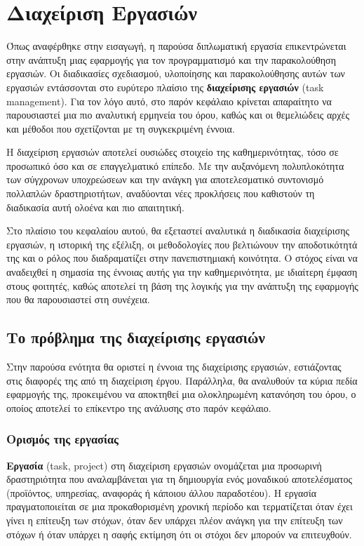 \chapter{Διαχείριση Εργασιών}
    Όπως αναφέρθηκε στην εισαγωγή, η παρούσα διπλωματική εργασία επικεντρώνεται στην ανάπτυξη μιας εφαρμογής για τον προγραμματισμό και την παρακολούθηση εργασιών. Οι διαδικασίες σχεδιασμού, υλοποίησης και παρακολούθησης αυτών των εργασιών εντάσσονται στο ευρύτερο πλαίσιο της \textbf{διαχείρισης εργασιών} (task management). Για τον λόγο αυτό, στο παρόν κεφάλαιο κρίνεται απαραίτητο να παρουσιαστεί μια πιο αναλυτική ερμηνεία του όρου, καθώς και οι θεμελιώδεις αρχές και μέθοδοι που σχετίζονται με τη συγκεκριμένη έννοια.

    Η διαχείριση εργασιών αποτελεί ουσιώδες στοιχείο της καθημερινότητας, τόσο σε προσωπικό όσο και σε επαγγελματικό επίπεδο. Με την αυξανόμενη πολυπλοκότητα των σύγχρονων υποχρεώσεων και την ανάγκη για αποτελεσματικό συντονισμό πολλαπλών δραστηριοτήτων, αναδύονται νέες προκλήσεις που καθιστούν τη διαδικασία αυτή ολοένα και πιο απαιτητική.

    Στο πλαίσιο του κεφαλαίου αυτού, θα εξεταστεί αναλυτικά η διαδικασία διαχείρισης εργασιών, η ιστορική της εξέλιξη, οι μεθοδολογίες που βελτιώνουν την αποδοτικότητά της και ο ρόλος που διαδραματίζει στην πανεπιστημιακή κοινότητα. Ο στόχος είναι να αναδειχθεί η σημασία της έννοιας αυτής για την καθημερινότητα, με ιδιαίτερη έμφαση στους φοιτητές, καθώς αποτελεί τη βάση της λογικής για την ανάπτυξη της εφαρμογής που θα παρουσιαστεί στη συνέχεια.

    \section{Το πρόβλημα της διαχείρισης εργασιών}
        Στην παρούσα ενότητα θα οριστεί η έννοια της διαχείρισης εργασιών, εστιάζοντας στις διαφορές της από τη διαχείριση έργου. Παράλληλα, θα αναλυθούν τα κύρια πεδία εφαρμογής της, προκειμένου να αποκτηθεί μια ολοκληρωμένη κατανόηση του όρου, ο οποίος αποτελεί το επίκεντρο της ανάλυσης στο παρόν κεφάλαιο.

        \subsection{Ορισμός της εργασίας}
            \textbf{Εργασία} (task, project) στη διαχείριση εργασιών ονομάζεται μια προσωρινή δραστηριότητα που αναλαμβάνεται για τη δημιουργία ενός μοναδικού αποτελέσματος (προϊόντος, υπηρεσίας, αναφοράς ή κάποιου άλλου παραδοτέου). Η εργασία πραγματοποιείται σε μια προκαθορισμένη χρονική περίοδο και τερματίζεται όταν έχει γίνει η επίτευξη των στόχων, όταν δεν υπάρχει πλέον ανάγκη για την επίτευξη των στόχων ή όταν υπάρχει η σαφής εκτίμηση ότι οι στόχοι δεν μπορούν να επιτευχθούν. \cite{PMBOK}

